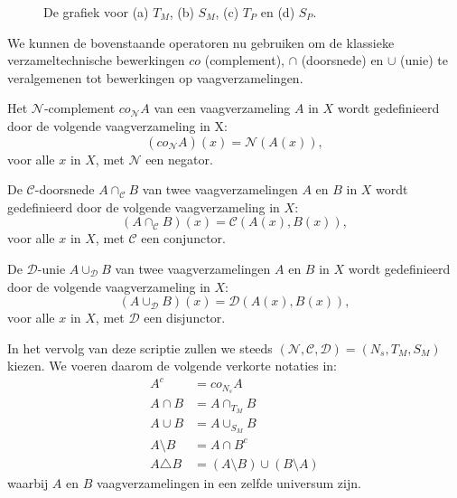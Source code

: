 \begin{figure}[bp]
\caption{\label{fig:grafieken_normen}De grafiek voor (a) $T_M$, (b) $S_M$, (c) $T_P$ en (d) $S_P$.}
\vspace{5pt}
\centering
{}
\vspace{5pt}
\end{figure}

We kunnen de bovenstaande operatoren nu gebruiken om de klassieke verzameltechnische bewerkingen 
$co$ (complement), $\cap$ (doorsnede) en $\cup$ (unie) te
veralgemenen tot bewerkingen op vaagverzamelingen.
\begin{definitie}
Het $\mathcal{N}$-complement $co_\mathcal{N} A$ van een vaagverzameling $A$ in $X$ wordt gedefinieerd
door de volgende vaagverzameling in X:
\begin{displaymath}
(co_\mathcal{N} A)(x) = \mathcal{N}(A(x)),
\end{displaymath}
voor alle $x$ in $X$, met $\mathcal{N}$ een negator.
\end{definitie}
\begin{definitie}
De $\mathcal{C}$-doorsnede $A \cap_\mathcal{C} B$ van twee vaagverzamelingen $A$ en $B$ in $X$
wordt gedefinieerd door de volgende vaagverzameling in $X$:
\begin{displaymath}
(A \cap_\mathcal{C} B)(x) = \mathcal{C}(A(x),B(x)),
\end{displaymath}
voor alle $x$ in $X$, met $\mathcal{C}$ een conjunctor.
\end{definitie}
\begin{definitie}
De $\mathcal{D}$-unie $A \cup_\mathcal{D} B$ van twee vaagverzamelingen $A$ en $B$ in $X$ wordt gedefinieerd door de
volgende vaagverzameling in $X$:
\begin{displaymath}
(A \cup_\mathcal{D} B)(x) = \mathcal{D}(A(x),B(x)),
\end{displaymath}
voor alle $x$ in $X$, met $\mathcal{D}$ een disjunctor.
\end{definitie}

In het vervolg van deze scriptie zullen we steeds 
$(\mathcal{N},\mathcal{C},\mathcal{D})=(N_s,T_M,S_M)$ kiezen. We voeren daarom de volgende
verkorte notaties in:
\begin{align*}
A^c 			&= co_{N_s} A \\
A \cap B 		&= A \cap_{T_M} B \\
A \cup B		&= A \cup_{S_M} B \\
A \setminus B  	&= A \cap B^c \\
A \triangle B 	&= (A \setminus B) \cup (B \setminus A)
\end{align*}
waarbij $A$ en $B$ vaagverzamelingen in een zelfde universum zijn.


